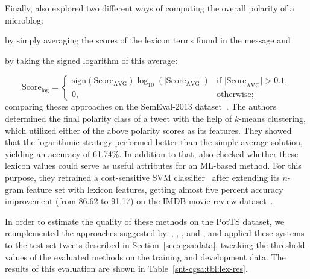Finally, \citet{Kolchyna:15} also explored two different ways of
computing the overall polarity of a microblog:
\begin{inparaenum}[(i)]
\item by simply averaging the scores of the lexicon terms found in the
  message and
\item by taking the signed logarithm of this average:
\end{inparaenum}
\begin{equation*}
  \text{Score}_{\log} =
  \begin{cases}
    \text{sign}(\text{Score}_{\text{AVG}})\log_{10}(|\text{Score}_{\text{AVG}}|) & %
    \text{if |Score}_{\text{AVG}}| > 0.1,\\
    0, & \text{otherwise};
  \end{cases}
\end{equation*}%
comparing theses approaches on the SemEval-2013
dataset~\cite{Nakov:13}.  The authors determined the final polarity
class of a tweet with the help of $k$-means clustering, which utilized
either of the above polarity scores as its features.  They showed that
the logarithmic strategy performed better than the simple average
solution, yielding an accuracy of 61.74\%.  In addition to that,
\citeauthor{Kolchyna:15} also checked whether these lexicon values
could serve as useful attributes for an ML-based method.  For this
purpose, they retrained a cost-sensitive SVM
classifier~\cite{Masnadi:12} after extending its $n$-gram feature set
with lexicon features, getting almost five percent accuracy
improvement (from 86.62 to 91.17) on the IMDB movie review
dataset~\cite{Pang:02}.



In order to estimate the quality of these methods on the PotTS
dataset, we reimplemented the approaches suggested
by~\citet{Taboada:11}, \citet{Musto:14}, \citet{Jurek:15}, and
\citet{Kolchyna:15}, and applied these systems to the test set tweets
described in Section~\ref{sec:cgsa:data}, tweaking the threshold
values of the evaluated methods on the training and development data.
The results of this evaluation are shown in Table~\ref{snt-cgsa:tbl:lex-res}.

